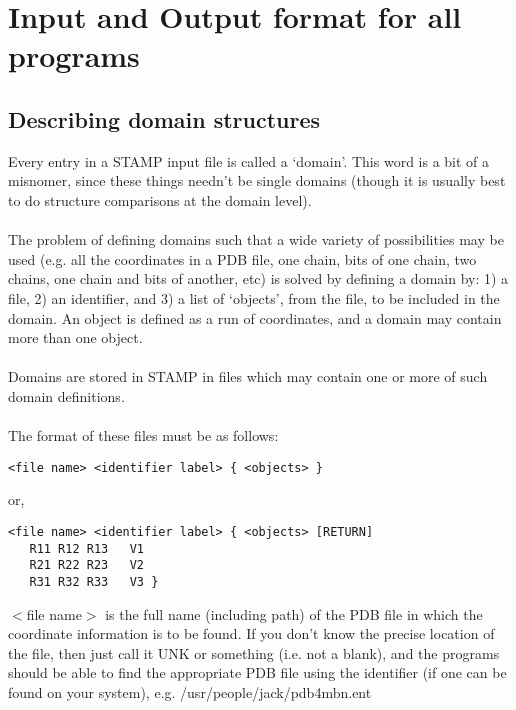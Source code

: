 \chapter{Input and Output format for all programs}

\section{Describing domain structures}

Every entry in a STAMP input file is called a `domain'.  This word
is a bit of a misnomer, since these things needn't be single domains
(though it is usually best to do structure comparisons at the domain level).\\
\\
The problem of defining domains such that a wide variety of 
possibilities may be used (e.g. all the coordinates in a PDB file,
one  chain, bits of one chain, two chains, one chain and bits of
another, etc) is solved by defining a domain by: 1) a file, 2) an
identifier, and 3) a list of `objects', from the file, to be
included in the domain.  An object is defined as a run of \Cal
coordinates, and a domain may contain more than one object.\\
\\
Domains are stored in STAMP in files which may contain one or
more of such domain definitions.\\
\\
The format of these files must be as follows:\\

\begin{scriptsize}\begin{verbatim}
<file name> <identifier label> { <objects> }
\end{verbatim} \end{scriptsize}

or,\\

\begin{scriptsize}\begin{verbatim}
<file name> <identifier label> { <objects> [RETURN]
   R11 R12 R13   V1
   R21 R22 R23   V2
   R31 R32 R33   V3 }
\end{verbatim} \end{scriptsize}

$<$file name$>$ is the full name (including path) of the PDB file in
which the coordinate information is to be found.  If you don't know the 
precise location of the file, then just call it UNK or something (i.e. 
not a blank), and the programs should be able to find the appropriate PDB 
file using the identifier (if one can be found on your system), e.g. 
/usr/people/jack/pdb4mbn.ent\\


